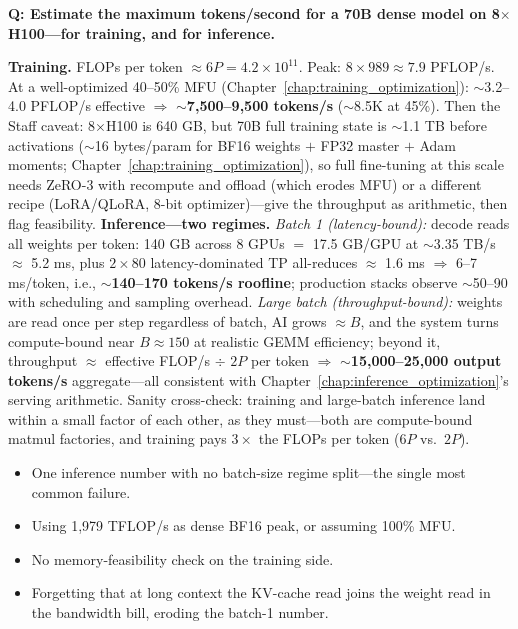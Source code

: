\begin{interviewq}
\textbf{Q: Estimate the maximum tokens/second for a 70B dense model on 8$\times$H100---for training, and for inference.}

 \quad {} \quad \badgefreq{\freqhigh}

\stronganswer \textbf{Training.} FLOPs per token $\approx 6P = 4.2\times10^{11}$. Peak: $8 \times 989 \approx 7.9$ PFLOP/s. At a well-optimized 40--50\% MFU (Chapter~\ref{chap:training_optimization}): $\sim$3.2--4.0 PFLOP/s effective $\Rightarrow$ \textbf{$\sim$7{,}500--9{,}500 tokens/s} ($\sim$8.5K at 45\%). Then the Staff caveat: 8$\times$H100 is 640 GB, but 70B full training state is $\sim$1.1 TB before activations ($\sim$16 bytes/param for BF16 weights $+$ FP32 master $+$ Adam moments; Chapter~\ref{chap:training_optimization}), so full fine-tuning at this scale needs ZeRO-3 with recompute and offload (which erodes MFU) or a different recipe (LoRA/QLoRA, 8-bit optimizer)---give the throughput as arithmetic, then flag feasibility. \textbf{Inference---two regimes.} \textit{Batch 1 (latency-bound):} decode reads all weights per token: 140 GB across 8 GPUs $=$ 17.5 GB/GPU at $\sim$3.35 TB/s $\approx$ 5.2 ms, plus $2 \times 80$ latency-dominated TP all-reduces $\approx$ 1.6 ms $\Rightarrow$ 6--7 ms/token, i.e., \textbf{$\sim$140--170 tokens/s roofline}; production stacks observe $\sim$50--90 with scheduling and sampling overhead. \textit{Large batch (throughput-bound):} weights are read once per step regardless of batch, AI grows $\approx B$, and the system turns compute-bound near $B \approx 150$ at realistic GEMM efficiency; beyond it, throughput $\approx$ effective FLOP/s $\div$ $2P$ per token $\Rightarrow$ \textbf{$\sim$15{,}000--25{,}000 output tokens/s} aggregate---all consistent with Chapter~\ref{chap:inference_optimization}'s serving arithmetic. Sanity cross-check: training and large-batch inference land within a small factor of each other, as they must---both are compute-bound matmul factories, and training pays $3\times$ the FLOPs per token ($6P$ vs.\ $2P$).

\redflags
\begin{itemize}
    \item One inference number with no batch-size regime split---the single most common failure.
    \item Using 1{,}979 TFLOP/s as dense BF16 peak, or assuming 100\% MFU.
    \item No memory-feasibility check on the training side.
    \item Forgetting that at long context the KV-cache read joins the weight read in the bandwidth bill, eroding the batch-1 number.
\end{itemize}


\end{interviewq}
